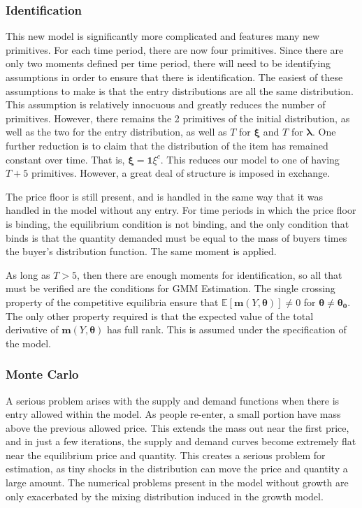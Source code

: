 \documentclass[12pt, letterpaper]{paper}
\begin{document}
\subsubsection{Identification}
\label{sec-4-5-1}
This new model is significantly more complicated and features many new
primitives. For each time period, there are now four primitives. Since
there are only two moments defined per time period, there will need to
be identifying assumptions in order to ensure that there is
identification. The easiest of these assumptions to make is that the
entry distributions are all the same distribution. This assumption is
relatively innocuous and greatly reduces the number of
primitives. However, there remains the 2 primitives of the initial
distribution, as well as the two for the entry distribution, as well as
$T$ for $\bm{\xi}$ and $T$ for $\bm{\lambda}$. One further reduction is to claim that the
distribution of the item has remained constant over time. That is, $\bm{\xi}
= \bm{1} \xi^c$. This reduces our model to one of having $T + 5$
primitives. However, a great deal of structure is imposed in exchange.

The price floor is still present, and is handled in the same way that
it was handled in the model without any entry. For time periods in
which the price floor is binding, the equilibrium condition is not
binding, and the only condition that binds is that the quantity
demanded must be equal to the mass of buyers times the buyer's
distribution function. The same moment is applied.

As long as $T > 5$, then there are enough moments for identification,
so all that must be verified are the conditions for GMM
Estimation. The single crossing property of the competitive equilibria
ensure that $\mathbb{E}[ \bm{m}( Y, \bm{\theta}) ] \neq 0$ for $\bm{\theta} \neq
\bm{\theta_0}$. The only other property required is that the expected value
of the total derivative of $\bm{m}( Y, \bm{\theta} )$ has full rank. This is
assumed under the specification of the model.

\subsubsection{Monte Carlo}
\label{sec-4-5-2}
A serious problem arises with the supply and demand functions when
there is entry allowed within the model. As people re-enter, a small
portion have mass above the previous allowed price. This extends the
mass out near the first price, and in just a few iterations, the supply
and demand curves become extremely flat near the equilibrium price and
quantity. This creates a serious problem for estimation, as tiny
shocks in the distribution can move the price and quantity a large
amount. The numerical problems present in the model without growth are
only exacerbated by the mixing distribution induced in the growth
model. 
\end{document}
